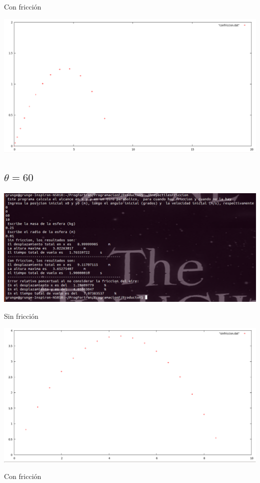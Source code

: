 \documentclass[notitlepage,12pt]{article}
\begin{document}
Con fricci\'on

\includegraphics[scale=0.3]{theta_30_plot_friction}

\subsection{$\theta=60$}
\includegraphics[scale=0.4]{theta_60}


Sin fricci\'on

\includegraphics[scale=0.3]{theta_60_plot_nofriction}

Con fricci\'on
\end{document}
